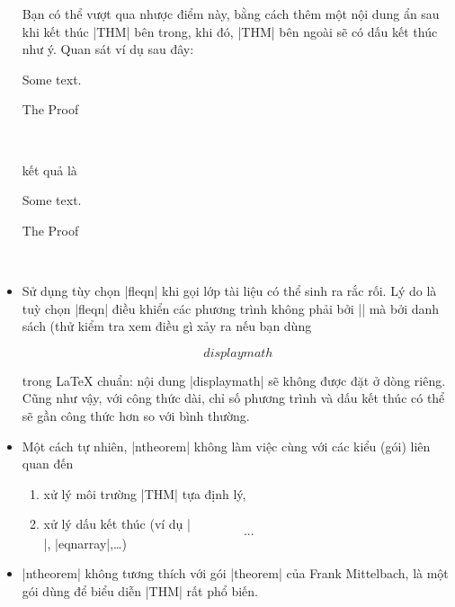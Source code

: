 \begin{itemize}
Bạn có thể vượt qua nhược điểm này, bằng cách thêm một nội dung ẩn
sau khi kết thúc |THM| bên trong, khi đó, |THM| bên ngoài sẽ có dấu
kết thúc như ý. Quan sát ví dụ sau đây:
\begin{example}
  \begin{Lemma}
   Some text.
   \begin{Proof}
   	The Proof
   \end{Proof}~
  \end{Lemma}
\end{example}
kết quả là

\begin{thmbox}
 \begin{Lemma}
  Some text.
  \begin{Proof} The Proof \end{Proof}~
 \end{Lemma}
\end{thmbox}

 \item
	Sử dụng tùy chọn |fleqn| khi gọi lớp tài liệu có thể sinh ra
	rắc rối. Lý do là tuỳ chọn |fleqn| điều khiển các phương trình
	không phải bởi |$$| mà bởi danh sách (thử kiểm tra xem điều
	gì xảy ra nếu bạn dùng
\begin{example}
  \begin{theorem} \[ displaymath \] \end{theorem}
\end{example}
	trong \LaTeX{} chuẩn: nội dung |displaymath| sẽ không được đặt ở dòng riêng.
	Cũng như vậy, với công thức dài, chỉ số phương trình và dấu kết thúc
	có thể sẽ gần công thức hơn so với bình thường.
 \item
	Một cách tự nhiên, |ntheorem| không làm việc cùng với các kiểu (gói)
	liên quan đến
  \begin{enumerate}
	\item xử lý môi trường |THM| tựa định lý,
	\item xử lý dấu kết thúc (ví dụ |\[...\]|, |eqnarray|,\ldots)
  \end{enumerate}
 \item
	|ntheorem| không tương thích với gói |theorem| của Frank Mittelbach,
	là một gói dùng để biểu diễn |THM| rất phổ biến.


\end{itemize}
